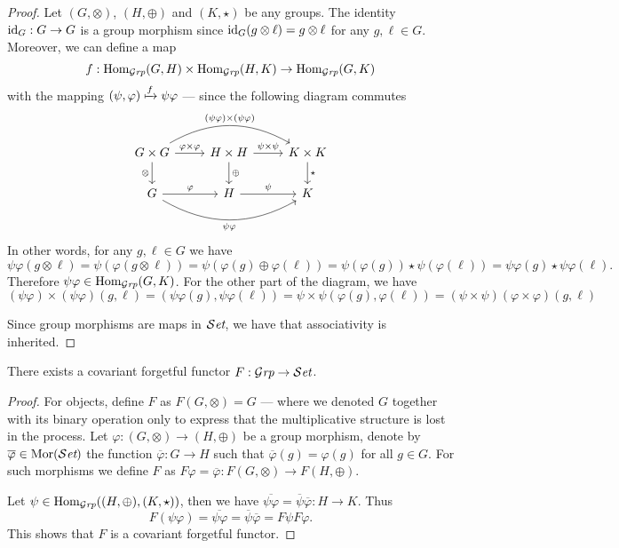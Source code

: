 \begin{proof}
  Let \((G, \otimes)\), \((H, \oplus)\) and \((K, \star)\) be any groups. The
  identity \(\operatorname{id}_G: G \to G\) is a group morphism since \(\operatorname{id}_G(g \otimes \ell)
  = g \otimes \ell\) for any \(g, \ell \in G\). Moreover, we can define a map
  \[
    f: \operatorname{Hom}_{{\mathcal{G}\textit{rp}}}(G, H) \times \operatorname{Hom}_{{\mathcal{G}\textit{rp}}}(H, K) \to \operatorname{Hom}_{{\mathcal{G}\textit{rp}}}(G, K)
  \]
  with the mapping \((\psi, \varphi) \xmapsto f \psi \varphi\) --- since
  the following diagram commutes
  \[
    \begin{tikzcd}
      G \times G \ar[r, "\varphi \times \varphi"]
      \ar[d, swap, "\otimes"]
      \ar[rr, bend left, "(\psi \varphi) \times (\psi \varphi)"]
      &H \times H \ar[r, "\psi \times \psi"]
      \ar[d, "\oplus"]
      &K \times K \ar[d, "\star"]
      \\
      G \ar[r, "\varphi"]
      \ar[rr, bend right, swap, "\psi \varphi"]
      &H \ar[r, "\psi"] &K
    \end{tikzcd}
  \]
  In other words, for any \(g, \ell \in G\) we have
  \[
    \psi \varphi (g \otimes \ell)
    = \psi(\varphi(g \otimes \ell))
    = \psi(\varphi(g) \oplus \varphi(\ell))
    = \psi(\varphi(g)) \star \psi(\varphi(\ell))
    = \psi \varphi(g) \star \psi \varphi(\ell).
  \]
  Therefore \(\psi \varphi \in \operatorname{Hom}_{\mathcal{G}\textit{rp}}(G, K)\). For the other part of the
  diagram, we have
  \[
    (\psi \varphi) \times (\psi \varphi) (g, \ell)
    = (\psi \varphi(g), \psi \varphi(\ell))
    = \psi \times \psi(\varphi(g), \varphi(\ell))
    =(\psi \times \psi) (\varphi \times \varphi) (g, \ell)
  \]

  Since group morphisms are maps in \({\mathcal{S}\textit{et}}\), we have that associativity is
  inherited.
\end{proof}

\begin{proposition}\label{prop: forgetful-func-grp-set}
  There exists a covariant forgetful functor \(F: {\mathcal{G}\textit{rp}} \to {\mathcal{S}\textit{et}}\).
\end{proposition}

\begin{proof}
  For objects, define \(F\) as \(F(G, \otimes) = G\) --- where we denoted \(G\)
  together with its binary operation only to express that the multiplicative
  structure is lost in the process. Let \(\varphi: (G, \otimes) \to (H,
  \oplus)\) be a group morphism, denote by \(\overline \varphi \in \operatorname{Mor}({\mathcal{S}\textit{et}})\)
  the function \(\overline\varphi: G \to H\) such that \(\overline\varphi(g) =
  \varphi(g)\) for all \(g \in G\). For such morphisms we define \(F\) as
  \(F\varphi = \overline\varphi: F(G, \otimes) \to F(H, \oplus)\).

  Let \(\psi \in \operatorname{Hom}_{\mathcal{G}\textit{rp}}((H, \oplus), (K, \star))\), then we have
  \(\overline{\psi \varphi} = \overline \psi \overline \varphi: H \to K\). Thus
  \[
    F(\psi \varphi) = \overline{\psi \varphi}
    = \overline \psi \overline \varphi = F\psi F\varphi.
  \]
  This shows that \(F\) is a covariant forgetful functor.
\end{proof}

